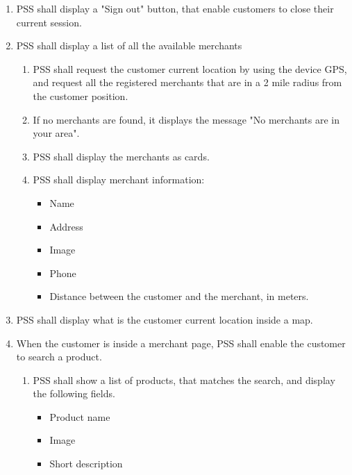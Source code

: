 \begin{enumerate}[label=SY-\arabic*]
    \item PSS shall display a "Sign out" button, that enable customers to close 
    their current session.
    \pagebreak
    \item PSS shall display a list of all the available merchants
    \begin{enumerate}[label=SY6-\arabic*]
        \item PSS shall request the customer current location by using the 
        device GPS, and request all the registered merchants that are in a 
        2 mile radius from the customer position.
        \item If no merchants are found, it displays the message "No merchants 
        are in your area".
        \item PSS shall display the merchants as 
        cards. \cite{material-design-cards}
        \item PSS shall display merchant information: 
        \begin{itemize}
            \item Name
            \item Address
            \item Image
            \item Phone
            \item Distance between the customer and the merchant, in meters.
        \end{itemize}
    \end{enumerate}
    \item PSS shall display what is the customer current location 
    inside a map.
    \item When the customer is inside a merchant page, PSS shall enable the 
    customer to search a product.
    \begin{enumerate}[label=SY8-\arabic*]
        \item PSS shall show a list of products, that matches the search, 
        and display the following fields.
        \begin{itemize}
            \item Product name
            \item Image 
            \item Short description
        \end{itemize}
    \end{enumerate}
    \end{enumerate}
